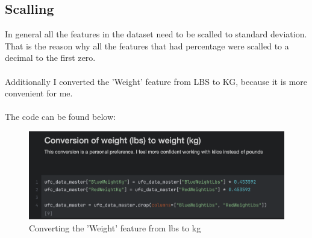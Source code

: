 \documentclass{article}
\begin{document}
  \subsection{Scalling}
  In general all the features in the dataset need to be scalled to standard deviation. That is the reason why all the features that had percentage were scalled to a decimal to the first zero.\\\\ 
  Additionally I converted the 'Weight' feature from LBS to KG, because it is more convenient for me. \\\\
  The code can be found below:\\
  \begin{figure}[H]
  	\centering
  	\includegraphics[width=1\textwidth]{images/Conversion_weight_lbs_to_kg.png}
  	\caption{Converting the 'Weight' feature from lbs to kg}
  \end{figure}
\end{document}
